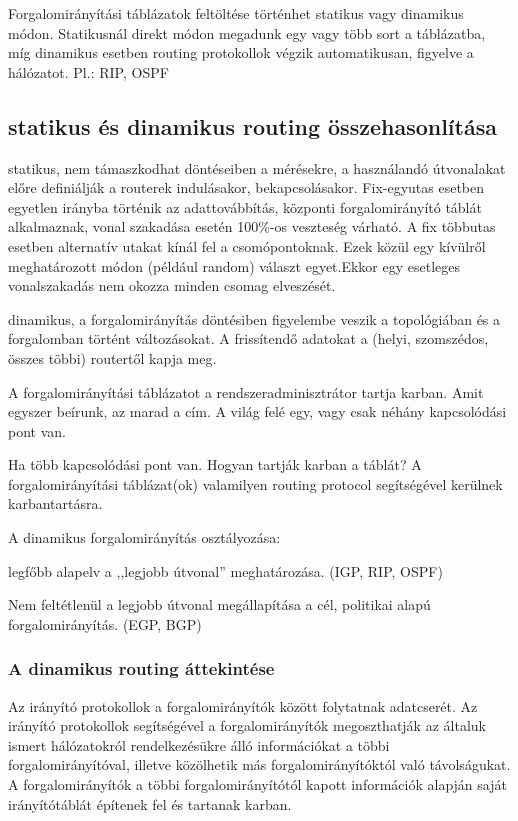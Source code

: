 Forgalomirányítási táblázatok feltöltése történhet statikus vagy dinamikus módon. Statikusnál
direkt módon megadunk egy vagy több sort a táblázatba, míg dinamikus esetben routing
protokollok végzik automatikusan, figyelve a hálózatot. Pl.: RIP, OSPF

\subsection{statikus és dinamikus routing összehasonlítása}
\begin{description}[nosep]
	\item[nem adaptív] statikus, nem támaszkodhat döntéseiben a mérésekre, a használandó útvonalakat előre definiálják a routerek indulásakor, bekapcsolásakor. Fix-egyutas esetben egyetlen irányba történik az adattovábbítás, központi forgalomirányító táblát alkalmaznak, vonal szakadása esetén 100\%-os veszteség várható. A fix többutas esetben alternatív utakat kínál fel a csomópontoknak. Ezek közül egy kívülről meghatározott módon (például random) választ egyet.Ekkor egy esetleges vonalszakadás nem okozza minden csomag elveszését.
	\item[adaptív] dinamikus, a forgalomirányítás döntésiben figyelembe veszik a topológiában és a forgalomban történt változásokat. A frissítendő adatokat a (helyi, szomszédos, összes többi) routertől kapja meg.
	\item[Statikus routing] A forgalomirányítási táblázatot a rendszeradminisztrátor tartja karban. Amit egyszer beírunk, az marad a cím. A világ felé egy, vagy csak néhány kapcsolódási pont van.
	\item[Dinamikus routing] Ha több kapcsolódási pont van. Hogyan tartják karban a táblát? A forgalomirányítási táblázat(ok) valamilyen routing protocol segítségével kerülnek karbantartásra.
\end{description}

A dinamikus forgalomirányítás osztályozása:
\begin{description}[nosep]
	\item [Belső forgalomirányíási protokollok] legfőbb alapelv a ,,legjobb útvonal'' meghatározása. (IGP, RIP, OSPF)
	\item[külső forgalomirányítási protokollok] Nem feltétlenül a legjobb útvonal megállapítása a cél, politikai alapú forgalomirányítás. (EGP, BGP)
\end{description}

\subsubsection{A dinamikus routing áttekintése}
Az irányító protokollok a forgalomirányítók között folytatnak adatcserét. Az irányító
protokollok segítségével a forgalomirányítók megoszthatják az általuk ismert hálózatokról
rendelkezésükre álló információkat a többi forgalomirányítóval, illetve közölhetik más
forgalomirányítóktól való távolságukat. A forgalomirányítók a többi forgalomirányítótól
kapott információk alapján saját irányítótáblát építenek fel és tartanak karban.

